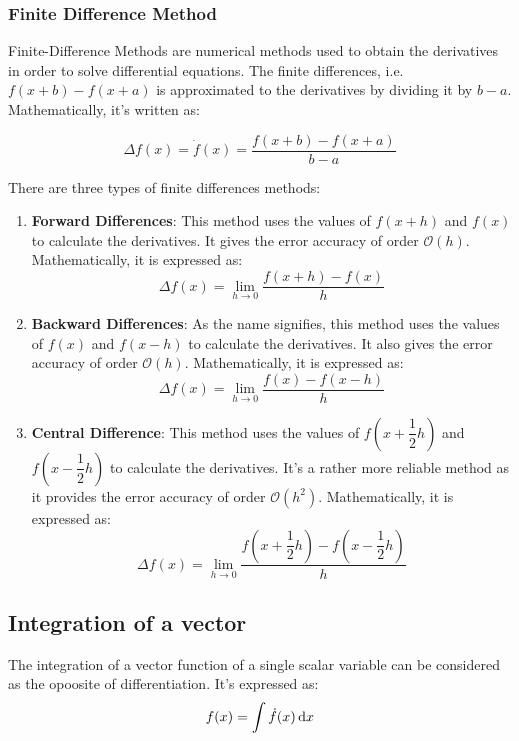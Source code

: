 \subsubsection{Finite Difference Method}
Finite-Difference Methods are numerical methods used to obtain the derivatives in order to solve differential equations. The finite differences, i.e. $ f(x+b) - f(x+a) $ is approximated to the derivatives by dividing it by $ b - a $. Mathematically, it's written as:

\begin{equation}
	\Delta f(x)=\dot{f}(x) = \frac{f(x+b) - f(x+a)}{b-a}
\end{equation}

There are three types of finite differences methods:

\begin{enumerate}
	\item \textbf{Forward Differences}: This method uses the values of $ f(x+h) $ and $f(x)$ to calculate the derivatives. It gives the error accuracy of order $\mathcal{O}(h) $. Mathematically, it is expressed as:
	\begin{equation}
		\Delta f(x) = \lim_{h\rightarrow 0}\frac{f(x + h) - f(x)}{h}
	\end{equation}
	\item \textbf{Backward Differences}: As the name signifies, this method uses the values of $ f(x) $ and $f(x - h)$ to calculate the derivatives. It also gives the error accuracy of order $\mathcal{O}(h) $. Mathematically, it is expressed as:
	\begin{equation}
	\Delta f(x) = \lim_{h\rightarrow 0}\frac{f(x) - f(x-h)}{h}
	\end{equation}
	\item \textbf{Central Difference}: This method uses the values of $ f(x+ \dfrac{1}{2}h) $ and $f(x - \dfrac{1}{2}h)$ to calculate the derivatives. It's a rather more reliable method as it provides the error accuracy of order $\mathcal{O}(h^{2}) $. Mathematically, it is expressed as:
	\begin{equation}
	\Delta f(x) = \lim_{h\rightarrow 0}\frac{f(x + \dfrac{1}{2}h) - f(x - \dfrac{1}{2}h)}{h}
	\end{equation}
	
\end{enumerate}

\subsection{Integration of a vector}
The integration of a vector function of a single scalar variable can be considered as the opoosite of differentiation. It's expressed as:
\begin{equation}
	f(x) = \int \dot{f}(x) \mathop{}\!\mathrm{d} x
\end{equation}

